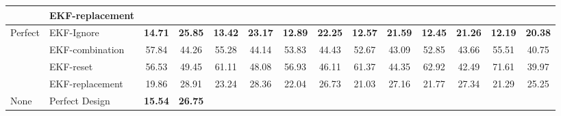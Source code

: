 \documentclass[letterpaper, 10 pt, conference]{ieeeconf}  %
\begin{document}
\begin{table*}[]
\begin{tabular}{@{}llcccccccccccc@{}}
	\multicolumn{1}{|l|}{} &
	\multicolumn{1}{l|}{EKF-replacement} &
	\multicolumn{1}{c|}{} &
	\multicolumn{1}{c|}{} &
	\multicolumn{1}{c|}{} &
	\multicolumn{1}{c|}{} &
	\multicolumn{1}{c|}{} &
	\multicolumn{1}{c|}{} &
	\multicolumn{1}{c|}{} &
	\multicolumn{1}{c|}{} &
	\multicolumn{1}{c|}{} &
	\multicolumn{1}{c|}{} &
	\multicolumn{1}{c|}{} &
	\multicolumn{1}{c|}{} \\ \midrule
	\multicolumn{1}{|l|}{\multirow{4}{*}{Perfect}} &
	\multicolumn{1}{l|}{EKF-Ignore} &
	\multicolumn{1}{c|}{\textbf{14.71}} &
	\multicolumn{1}{c|}{\textbf{25.85}} &
	\multicolumn{1}{c|}{\textbf{13.42}} &
	\multicolumn{1}{c|}{\textbf{23.17}} &
	\multicolumn{1}{c|}{\textbf{12.89}} &
	\multicolumn{1}{c|}{\textbf{22.25}} &
	\multicolumn{1}{c|}{\textbf{12.57}} &
	\multicolumn{1}{c|}{\textbf{21.59}} &
	\multicolumn{1}{c|}{\textbf{12.45}} &
	\multicolumn{1}{c|}{\textbf{21.26}} &
	\multicolumn{1}{c|}{\textbf{12.19}} &
	\multicolumn{1}{c|}{\textbf{20.38}} \\ \cmidrule(l){2-14} 
	\multicolumn{1}{|l|}{} &
	\multicolumn{1}{l|}{EKF-combination} &
	\multicolumn{1}{c|}{57.84} &
	\multicolumn{1}{c|}{44.26} &
	\multicolumn{1}{c|}{55.28} &
	\multicolumn{1}{c|}{44.14} &
	\multicolumn{1}{c|}{53.83} &
	\multicolumn{1}{c|}{44.43} &
	\multicolumn{1}{c|}{52.67} &
	\multicolumn{1}{c|}{43.09} &
	\multicolumn{1}{c|}{52.85} &
	\multicolumn{1}{c|}{43.66} &
	\multicolumn{1}{c|}{55.51} &
	\multicolumn{1}{c|}{40.75} \\ \cmidrule(l){2-14} 
	\multicolumn{1}{|l|}{} &
	\multicolumn{1}{l|}{EKF-reset} &
	\multicolumn{1}{c|}{56.53} &
	\multicolumn{1}{c|}{49.45} &
	\multicolumn{1}{c|}{61.11} &
	\multicolumn{1}{c|}{48.08} &
	\multicolumn{1}{c|}{56.93} &
	\multicolumn{1}{c|}{46.11} &
	\multicolumn{1}{c|}{61.37} &
	\multicolumn{1}{c|}{44.35} &
	\multicolumn{1}{c|}{62.92} &
	\multicolumn{1}{c|}{42.49} &
	\multicolumn{1}{c|}{71.61} &
	\multicolumn{1}{c|}{39.97} \\ \cmidrule(l){2-14} 
	\multicolumn{1}{|l|}{} &
	\multicolumn{1}{l|}{EKF-replacement} &
	\multicolumn{1}{c|}{19.86} &
	\multicolumn{1}{c|}{28.91} &
	\multicolumn{1}{c|}{23.24} &
	\multicolumn{1}{c|}{28.36} &
	\multicolumn{1}{c|}{22.04} &
	\multicolumn{1}{c|}{26.73} &
	\multicolumn{1}{c|}{21.03} &
	\multicolumn{1}{c|}{27.16} &
	\multicolumn{1}{c|}{21.77} &
	\multicolumn{1}{c|}{27.34} &
	\multicolumn{1}{c|}{21.29} &
	\multicolumn{1}{c|}{25.25} \\ \midrule
	\multicolumn{1}{|l|}{\multirow{2}{*}{None}} &
	\multicolumn{1}{l|}{Perfect Design} &
	\multicolumn{1}{c|}{\textbf{15.54}} &
	\multicolumn{1}{c|}{\textbf{26.75}} &

\end{tabular}
\end{table*}
\end{document}

